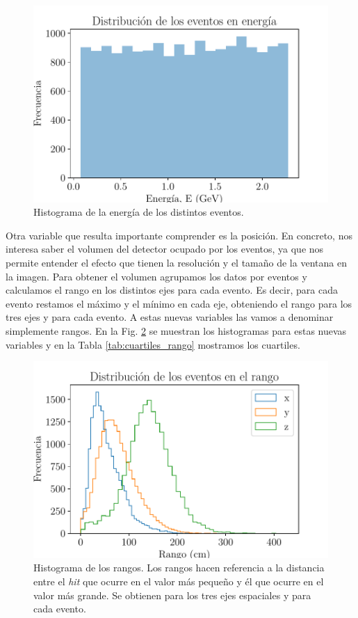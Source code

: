 \documentclass[a4paper,12pt,oneside,titlepage]{book}
\begin{document}
\begin{figure}[h!]
  \centering
  \includegraphics[scale=0.85]{hist_en.pdf}
  \caption{Histograma de la energía de los distintos eventos.}
  \label{fig:hist_energia}
\end{figure}

Otra variable que resulta importante comprender es la posición. En concreto, nos interesa saber el volumen del detector ocupado por los eventos, ya que nos permite entender el efecto que tienen la resolución y el tamaño de la ventana en la imagen. Para obtener el volumen agrupamos los datos por eventos y calculamos el rango en los distintos ejes para cada evento. Es decir, para cada evento restamos el máximo y el mínimo en cada eje, obteniendo el rango para los tres ejes y para cada evento. A estas nuevas variables las vamos a denominar simplemente rangos. En la Fig. \ref{fig:hist_rango} se muestran los histogramas para estas nuevas variables y en la Tabla \ref{tab:cuartiles_rango} mostramos los cuartiles.

\begin{figure}[h!]
  \centering
  \includegraphics[scale=0.85]{hist_rango.pdf}
  \caption{Histograma de los rangos. Los rangos hacen referencia a la distancia entre el \textit{hit} que ocurre en el valor más pequeño y él que ocurre en el valor más grande. Se obtienen para los tres ejes espaciales y para cada evento.}
  \label{fig:hist_rango}
\end{figure}
\end{document}
